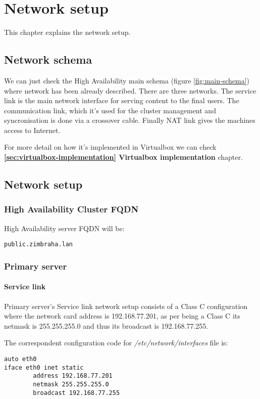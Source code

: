 

\chapter{Network setup}
\label{chap:network-setup}
This chapter explains the network setup.

\section {Network schema}
We can just check the High Availability main schema (figure \ref{fig:main-schema}) where network has been already described. There are three networks. The service link is the main network interface for serving content to the final users. The communication link, which it's used for the cluster management and syncronisation is done via a crossover cable. Finally NAT link gives the machines access to Internet.

For more detail on how it's implemented in Virtualbox we can check \textbf{\ref{sec:virtualbox-implementation} Virtualbox implementation} chapter.

\section {Network setup}

\subsection {High Availability Cluster FQDN}
High Availability server FQDN will be:
\begin{verbatim}
public.zimbraha.lan
\end{verbatim}


\subsection {Primary server}
\subsubsection {Service link}
Primary server's Service link network setup consists of a Class C configuration where the network card address is 192.168.77.201, as per being a Class C its netmask is 255.255.255.0 and thus its broadcast is 192.168.77.255.

The correspondent configuration code for \textit{/etc/network/interfaces} file is:
\begin{verbatim}
auto eth0
iface eth0 inet static
        address 192.168.77.201
        netmask 255.255.255.0
        broadcast 192.168.77.255
\end{verbatim}

